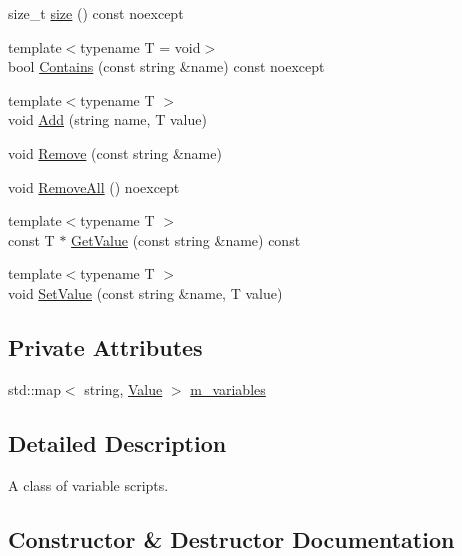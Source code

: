 \begin{DoxyCompactItemize}
\item 
size\+\_\+t \mbox{\hyperlink{classmage_1_1_variable_script_a20e376c802dae71e001037afc316c795}{size}} () const noexcept
\item 
{\footnotesize template$<$typename T  = void$>$ }\\bool \mbox{\hyperlink{classmage_1_1_variable_script_a86143720f1495e20d461e0a65e2c5c8d}{Contains}} (const string \&name) const noexcept
\item 
{\footnotesize template$<$typename T $>$ }\\void \mbox{\hyperlink{classmage_1_1_variable_script_ad41e19065e7935974585a1b120ef47d4}{Add}} (string name, T value)
\item 
void \mbox{\hyperlink{classmage_1_1_variable_script_aac74a9edbe78e0caa1095ce32835501d}{Remove}} (const string \&name)
\item 
void \mbox{\hyperlink{classmage_1_1_variable_script_add51955d83e85e6d6acd82cfe40bed26}{Remove\+All}} () noexcept
\item 
{\footnotesize template$<$typename T $>$ }\\const T $\ast$ \mbox{\hyperlink{classmage_1_1_variable_script_aaed50c03f7affeeac269fbc15248caf6}{Get\+Value}} (const string \&name) const
\item 
{\footnotesize template$<$typename T $>$ }\\void \mbox{\hyperlink{classmage_1_1_variable_script_a43772c8d83466b32a6f16e5564d43026}{Set\+Value}} (const string \&name, T value)
\end{DoxyCompactItemize}
\subsection*{Private Attributes}
\begin{DoxyCompactItemize}
\item 
std\+::map$<$ string, \mbox{\hyperlink{namespacemage_a5bc219b33037a43e23f59e4e8ddff10d}{Value}} $>$ \mbox{\hyperlink{classmage_1_1_variable_script_aed925cedf17c486fad876764e53d9e04}{m\+\_\+variables}}
\end{DoxyCompactItemize}


\subsection{Detailed Description}
A class of variable scripts. 

\subsection{Constructor \& Destructor Documentation}
\mbox{\label{classmage_1_1_variable_script_a87830f09a97aa8f7df3074029c5ab8d5}} 

